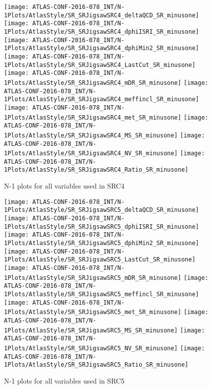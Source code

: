 \begin{figure}[tbp]
\begin{center}
\texttt{[image: ATLAS-CONF-2016-078\_INT/N-1Plots/AtlasStyle/SR\_SRJigsawSRC4\_deltaQCD\_SR\_minusone]}
\texttt{[image: ATLAS-CONF-2016-078\_INT/N-1Plots/AtlasStyle/SR\_SRJigsawSRC4\_dphiISRI\_SR\_minusone]}
\texttt{[image: ATLAS-CONF-2016-078\_INT/N-1Plots/AtlasStyle/SR\_SRJigsawSRC4\_dphiMin2\_SR\_minusone]}
\texttt{[image: ATLAS-CONF-2016-078\_INT/N-1Plots/AtlasStyle/SR\_SRJigsawSRC4\_LastCut\_SR\_minusone]}
\texttt{[image: ATLAS-CONF-2016-078\_INT/N-1Plots/AtlasStyle/SR\_SRJigsawSRC4\_mDR\_SR\_minusone]}
\texttt{[image: ATLAS-CONF-2016-078\_INT/N-1Plots/AtlasStyle/SR\_SRJigsawSRC4\_meffincl\_SR\_minusone]}
\texttt{[image: ATLAS-CONF-2016-078\_INT/N-1Plots/AtlasStyle/SR\_SRJigsawSRC4\_met\_SR\_minusone]}
\texttt{[image: ATLAS-CONF-2016-078\_INT/N-1Plots/AtlasStyle/SR\_SRJigsawSRC4\_MS\_SR\_minusone]}
\texttt{[image: ATLAS-CONF-2016-078\_INT/N-1Plots/AtlasStyle/SR\_SRJigsawSRC4\_NV\_SR\_minusone]}
\texttt{[image: ATLAS-CONF-2016-078\_INT/N-1Plots/AtlasStyle/SR\_SRJigsawSRC4\_Ratio\_SR\_minusone]}
\end{center}
\caption{N-1 plots for all variables used in SRC4}
\label{fig:SR_SRJigsawSRC4_deltaQCD_SR_minusone}
\end{figure}

\clearpage
\begin{figure}[tbp]
\begin{center}
\texttt{[image: ATLAS-CONF-2016-078\_INT/N-1Plots/AtlasStyle/SR\_SRJigsawSRC5\_deltaQCD\_SR\_minusone]}
\texttt{[image: ATLAS-CONF-2016-078\_INT/N-1Plots/AtlasStyle/SR\_SRJigsawSRC5\_dphiISRI\_SR\_minusone]}
\texttt{[image: ATLAS-CONF-2016-078\_INT/N-1Plots/AtlasStyle/SR\_SRJigsawSRC5\_dphiMin2\_SR\_minusone]}
\texttt{[image: ATLAS-CONF-2016-078\_INT/N-1Plots/AtlasStyle/SR\_SRJigsawSRC5\_LastCut\_SR\_minusone]}
\texttt{[image: ATLAS-CONF-2016-078\_INT/N-1Plots/AtlasStyle/SR\_SRJigsawSRC5\_mDR\_SR\_minusone]}
\texttt{[image: ATLAS-CONF-2016-078\_INT/N-1Plots/AtlasStyle/SR\_SRJigsawSRC5\_meffincl\_SR\_minusone]}
\texttt{[image: ATLAS-CONF-2016-078\_INT/N-1Plots/AtlasStyle/SR\_SRJigsawSRC5\_met\_SR\_minusone]}
\texttt{[image: ATLAS-CONF-2016-078\_INT/N-1Plots/AtlasStyle/SR\_SRJigsawSRC5\_MS\_SR\_minusone]}
\texttt{[image: ATLAS-CONF-2016-078\_INT/N-1Plots/AtlasStyle/SR\_SRJigsawSRC5\_NV\_SR\_minusone]}
\texttt{[image: ATLAS-CONF-2016-078\_INT/N-1Plots/AtlasStyle/SR\_SRJigsawSRC5\_Ratio\_SR\_minusone]}
\end{center}
\caption{N-1 plots for all variables used in SRC5}
\label{fig:SR_SRJigsawSRC5_dphiMin2_SR_minusone}
\end{figure}
\clearpage

